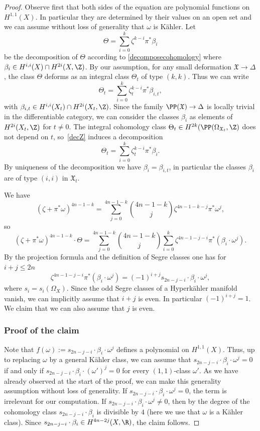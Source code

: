 \begin{proof}
Observe first that both sides of the equation are polynomial functions on $H^{1,1}(X)$.
In particular they are determined by their values on an open set and we can assume
without loss of generality that $\omega$ is Kähler.
Let
\begin{equation} \label{decZ}
\Theta=\sum_{i=0}^{k} \zeta^{k-i} \pi^* \beta_{i}
\end{equation}
be the decomposition of $\Theta$ according to \eqref{decomposecohomology}
where $\beta_{i} \in H^{i,i} (X) \cap H^{2i}(X, \Z)$.
By our assumption, for any small deformation $\mathfrak X \to \Delta$, the class $\Theta$ deforms
as an integral class $\Theta_t$ of type $(k,k)$. Thus we can write
\[
\Theta_t=\sum_{i=0}^{k} \zeta_t^{k-i} \pi^* \beta_{i,t},
\]
with $\beta_{i,t} \in H^{i,i} (X_t) \cap H^{2i}(X_t, \Z)$. Since the family $\PP(\mathfrak X) \to \Delta$
is locally trivial in the differentiable category, we can consider the classes $\beta_{i}$ as elements of
$H^{2i}(X_t, \Z)$ for $t \neq 0$. The integral cohomology class $\Theta_t \in H^{2k}(\PP(\Omega_{\mathfrak X_t}, \Z)$ does not depend on $t$, so~\eqref{decZ} induces a decomposition
\[
\Theta_t=\sum_{i=0}^{k} \zeta_t^{k-i} \pi^* \beta_{i}.
\]
By uniqueness of the decomposition we have $\beta_i = \beta_{i,t}$, in particular the classes
$\beta_{i}$ are of type $(i,i)$ in $\mathfrak X_t$.

We have
\[
(\zeta+\pi^*\omega)^{4n-1-k}
=
\sum_{j=0}^{4n-1-k} \binom{4n-1-k}{j} \zeta^{4n-1-k-j} \pi^* \omega^j,
\]
so
\[
(\zeta+\pi^*\omega)^{4n-1-k} \cdot \Theta
=
\sum_{j=0}^{4n-1-k}
\binom{4n-1-k}{j}
\sum_{i=0}^{k} \zeta^{4n-1-j-i} \pi^* (\beta_{i} \cdot \omega^j)
.
\]
By the projection formula and the definition of Segre classes one has for $i+j \leq 2n$
\[
\zeta^{4n-1-j-i} \pi^* (\beta_{i} \cdot \omega^j)
=
(-1)^{i+j} s_{2n-j-i} \cdot \beta_{i} \cdot \omega^j,
\]
where $s_i=s_i(\Omega_X)$.
Since the odd Segre classes of a Hyperkähler manifold vanish, we can implicitly assume that
$i+j$ is even. In particular $(-1)^{i+j}=1$.
We claim that we can also assume that $j$ is even.

\subsubsection*{Proof of the claim}
Note that $f(\omega):=s_{2n-j-i} \cdot \beta_{i} \cdot \omega^j$ defines a polynomial on $H^{1,1}(X)$.
Thus, up to replacing $\omega$ by a general Kähler class, we can assume that $s_{2n-j-i} \cdot \beta_{i} \cdot \omega^j = 0$
if and only if $s_{2n-j-i} \cdot \beta_{i} \cdot (\omega')^j = 0$ for every $(1,1)$-class $\omega'$. As we have already observed at the start of the proof, we can make this generality assumption without loss of generality.
If $s_{2n-j-i} \cdot \beta_{i} \cdot \omega^j = 0$, the term is irrelevant for our computation.
If $s_{2n-j-i} \cdot \beta_{i} \cdot \omega^j \neq 0$,
then by \cite[Th.\,2.1]{Ver96} the degree of the cohomology class $s_{2n-j-i} \cdot \beta_{i}$ is divisible by $4$ (here we use that $\omega$ is a Kähler class).
Since $s_{2n-j-i} \cdot \beta_{i} \in H^{4n-2j}(X, \R)$, the claim follows.


\end{proof}
